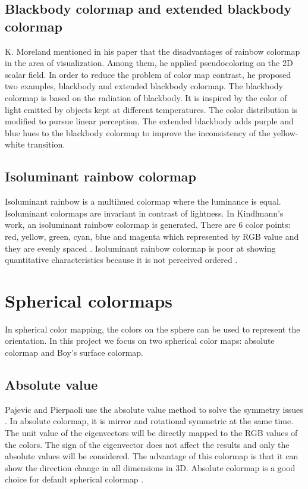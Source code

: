 \documentclass[hyperref, plainreport, noproblem]{cgvpub1}
\begin{document}
\subsection{Blackbody colormap and extended blackbody colormap}
K. Moreland mentioned in his paper \cite{moreland2016} that the disadvantages of rainbow colormap in the area of visualization. Among them, he applied pseudocoloring on the 2D scalar field. In order to reduce the problem of color map contrast, he proposed two examples, blackbody and extended blackbody colormap. The blackbody colormap is based on the radiation of blackbody. It is inspired by the color of light emitted by objects kept at different temperatures. The color distribution is modified to pursue linear perception. The extended blackbody adds purple and blue hues to the blackbody colormap to improve the inconsistency of the yellow-white transition. 

\subsection{Isoluminant rainbow colormap}
Isoluminant rainbow is a multihued colormap where the luminance is equal. Isoluminant colormaps are invariant in contrast of lightness. In Kindlmann’s work, an isoluminant rainbow colormap is generated. There are 6 color points: red, yellow, green, cyan, blue and magenta which represented by RGB value and they are evenly spaced \cite{kindlmann}. Isoluminant rainbow colormap is poor at showing quantitative characteristics because it is not perceived ordered \cite{moreland2019}. 

\section{Spherical colormaps}

In spherical color mapping, the colors on the sphere can be used to represent the orientation. In this project we focus on two spherical color maps: absolute colormap and Boy’s surface colormap.


\subsection{Absolute value}
Pajevic and Pierpaoli use the absolute value method to solve the symmetry issues \cite{pajevic}. In absolute colormap, it is mirror and rotational symmetric at the same time. The unit value of the eigenvectors will be directly mapped to the RGB values of the colors. The sign of the eigenvector does not affect the results and only the absolute values will be considered. The advantage of this colormap is that it can show the direction change in all dimensions in 3D. Absolute colormap is a good choice for default spherical colormap \cite{moreland2019}.
\end{document}
